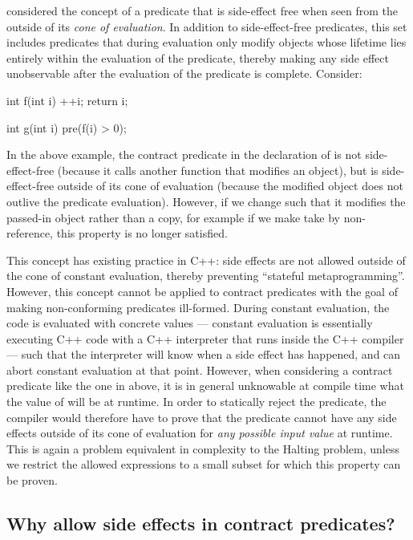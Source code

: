 \cite{P2680R1} considered the concept of a predicate that is side-effect free when seen from the outside of its \emph{cone of evaluation}. In addition to side-effect-free predicates, this set includes predicates that during evaluation only modify objects whose lifetime lies entirely within the evaluation of the predicate, thereby making any side effect unobservable after the evaluation of the predicate is complete. Consider:
\begin{codeblock}
int f(int i) {
  ++i;
  return i;
}

int g(int i)
  pre(f(i) > 0);
\end{codeblock}

In the above example, the contract predicate in the declaration of  is not side-effect-free (because it calls another function  that modifies an object), but is side-effect-free outside of its cone of evaluation (because the modified object does not outlive the predicate evaluation). However, if we change  such that it modifies the passed-in object rather than a copy, for example if we make  take  by non- reference, this property is no longer satisfied.

This concept has existing practice in C++: side effects are not allowed outside of the cone of constant evaluation, thereby preventing ``stateful metaprogramming''. However, this concept cannot be applied to contract predicates with the goal of making non-conforming predicates ill-formed. During constant evaluation, the code is evaluated with concrete values --- constant evaluation is essentially executing  C++ code with a C++ interpreter that runs inside the C++ compiler --- such that the interpreter will know when a side effect has happened, and can abort constant evaluation at that point. However, when considering a contract predicate like the one in  above, it is in general unknowable at compile time what the value of  will be at runtime. In order to statically reject the predicate, the compiler would therefore have to prove that the predicate cannot have any side effects outside of its cone of evaluation for \emph{any possible input value} at runtime. This is again a problem equivalent in complexity to the Halting problem, unless we restrict the allowed expressions to a small subset for which this property can be proven.

\subsection{Why allow side effects in contract predicates?}

